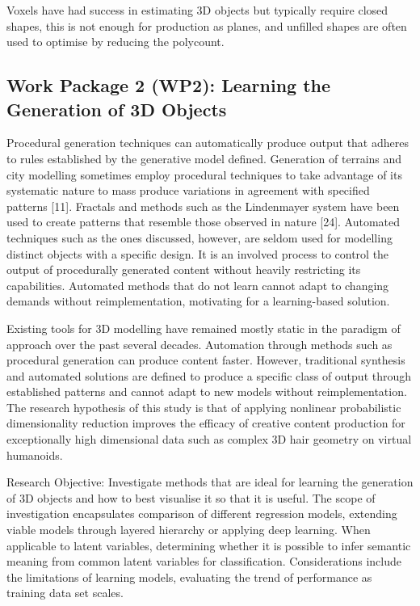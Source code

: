 \documentclass[a4paper, fontsize=15pt, onecolumn]{article} %
\numberwithin{equation}{section} %
\numberwithin{figure}{section} %
\numberwithin{table}{section} %
\begin{document}
Voxels have had success in estimating 3D objects but typically require closed shapes, this is not enough for production as planes, and unfilled shapes are often used to optimise by reducing the polycount.

\subsection{Work Package 2 (WP2): Learning the Generation of 3D Objects}
Procedural generation techniques can automatically produce output that adheres to rules established by the generative model defined. Generation of terrains and city modelling sometimes employ procedural techniques to take advantage of its systematic nature to mass produce variations in agreement with specified patterns [11]. Fractals and methods such as the Lindenmayer system have been used to create patterns that resemble those observed in nature [24]. Automated techniques such as the ones discussed, however, are seldom used for modelling distinct objects with a specific design. It is an involved process to control the output of procedurally generated content without heavily restricting its capabilities. Automated methods that do not learn cannot adapt to changing demands without reimplementation, motivating for a learning-based solution.

Existing tools for 3D modelling have remained mostly static in the paradigm of approach over the past several decades. Automation through methods such as procedural generation can produce content faster. However, traditional synthesis and automated solutions are defined to produce a specific class of output through established patterns and cannot adapt to new models without reimplementation. The research hypothesis of this study is that of applying nonlinear probabilistic dimensionality reduction improves the efficacy of creative content production for exceptionally high dimensional data such as complex 3D hair geometry on virtual humanoids.


Research Objective: Investigate methods that are ideal for learning the generation of 3D objects and how to best visualise it so that it is useful. The scope of investigation encapsulates comparison of different regression models, extending viable models through layered hierarchy or applying deep learning. When applicable to latent variables, determining whether it is possible to infer semantic meaning from common latent variables for classification. Considerations include the limitations of learning models, evaluating the trend of performance as training data set scales.
\end{document}
